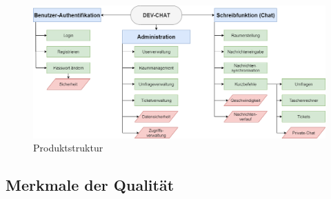 \begin{figure}[h!]
    \centering
    \includegraphics[width=1\textwidth, keepaspectratio]{images/Produktstruktur.png}
    \caption{Produktstruktur}
    \label{fig:Produktstruktur}
  \end{figure}

\newpage
\subsection{Merkmale der Qualität}
